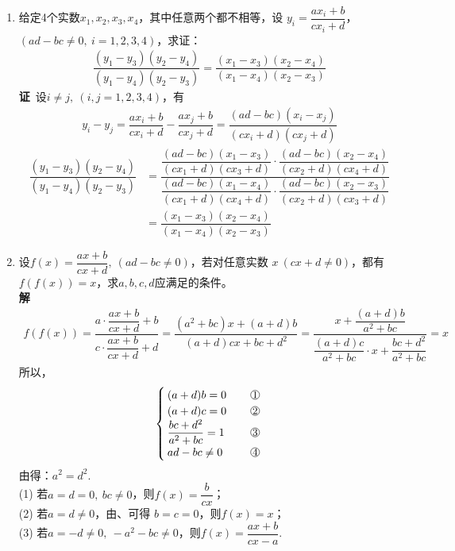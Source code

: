 \begin{enumerate}[label={【\textbf{例\thechapter.\arabic*}】},
 leftmargin=\inteval{\myenumleftmargin}pt,
 itemsep=\inteval{\myenumitempsep}pt,
 itemindent=\inteval{\myenumitemindent}pt]
\item \label{分式线性变换保交比例题}
给定4个实数$ x_1,x_2,x_3,x_4 $，其中任意两个都不相等，设
$ y_i=\dfrac{ax_i+b}{cx_i+d} $，$ (ad-bc\neq 0,\ i=1,2,3,4) $，求证：
\begin{gather}\label{分式线性变换保交比}
    \dfrac{(y_1-y_3)(y_2-y_4)}{(y_1-y_4)(y_2-y_3)}=
    \dfrac{(x_1-x_3)(x_2-x_4)}{(x_1-x_4)(x_2-x_3)}
\end{gather}
\textbf{证}\ 设$ i\neq j,\ (i,j=1,2,3,4) $，有
\begin{gather*}
    y_i-y_j=\dfrac{ax_i+b}{cx_i+d}-\dfrac{ax_j+b}{cx_j+d}=
    \dfrac{(ad-bc)(x_i-x_j)}{(cx_i+d)(cx_j+d)}
\end{gather*}
\begin{align*}
    \dfrac{(y_1-y_3)(y_2-y_4)}{(y_1-y_4)(y_2-y_3)} &=
    \dfrac{\dfrac{(ad-bc)(x_1-x_3)}{(cx_1+d)(cx_3+d)}\cdot
        \dfrac{(ad-bc)(x_2-x_4)}{(cx_2+d)(cx_4+d)}}{
        \dfrac{(ad-bc)(x_1-x_4)}{(cx_1+d)(cx_4+d)}\cdot
        \dfrac{(ad-bc)(x_2-x_3)}{(cx_2+d)(cx_3+d)} } \\
    &=\dfrac{(x_1-x_3)(x_2-x_4)}{(x_1-x_4)(x_2-x_3)}
\end{align*}

\item 设$ f(x)=\dfrac{ax+b}{cx+d},\ (ad-bc\neq 0) $，若对任意实数
$ x\ (cx+d\neq 0) $，都有$ f(f(x))=x $，求$ a,b,c,d $应满足的条件。\\
\textbf{解}\ 
\begin{gather*}
    f(f(x))=\dfrac{a\cdot\dfrac{ax+b}{cx+d}+b}{c\cdot
        \dfrac{ax+b}{cx+d}+d}=
    \dfrac{(a^2+bc)x+(a+d)b}{(a+d)cx+bc+d^2}=
    \dfrac{x+\dfrac{(a+d)b}{a^2+bc}}{\dfrac{(a+d)c}{a^2+bc}
        \cdot x+ \dfrac{bc+d^2}{a^2+bc}}=x
\end{gather*}
所以，
\begin{align*}
    \begin{cases}
        (a+d)b=0\q  & \mycircled{1} \\
        (a+d)c=0\q  & \mycircled{2} \\
        \dfrac{bc+d^2}{a^2+bc}=1\q  & \mycircled{3} \\
        ad-bc\neq 0\q  & \mycircled{4}
    \end{cases}
\end{align*}
由得：$ a^2=d^2 $. \\
(1) 若$ a=d=0,\ bc\neq 0 $，则$ f(x)=\dfrac{b}{cx} $；\\
(2) 若$ a=d\neq 0 $，由、可得
$ b=c=0 $，则$ f(x)=x $；\\
(3) 若$ a=-d\neq 0,\ -a^2-bc\neq 0 $，则$ f(x)=\dfrac{ax+b}{cx-a} $.


\end{enumerate}
